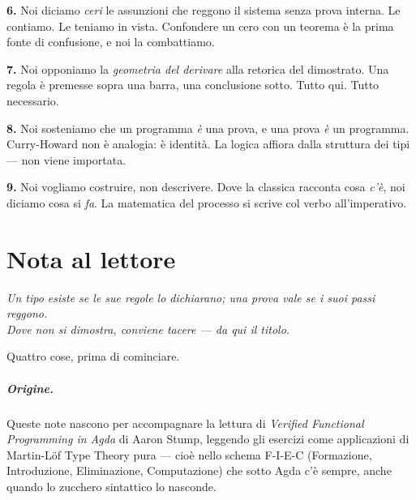 \documentclass[
  oneside,
  openany,
  titlepage,
  11pt,
  a4paper,
  italian,
  DIV=14,
  headinclude,
  footinclude=true,
  cleardoublepage=empty
]{scrbook}
\theoremstyle{ctplain}
\theoremstyle{ctdef}
\theoremstyle{ctrem}
\theoremstyle{ctcero}
\begin{document}
{\color{halfgray}\sffamily\bfseries 6.}\quad
Noi diciamo \emph{ceri} le assunzioni che reggono il sistema senza prova interna. Le contiamo. Le teniamo in vista. Confondere un cero con un teorema \`e la prima fonte di confusione, e noi la combattiamo.

{\color{halfgray}\sffamily\bfseries 7.}\quad
Noi opponiamo la \emph{geometria del derivare} alla retorica del dimostrato. Una regola \`e premesse sopra una barra, una conclusione sotto. Tutto qui. Tutto necessario.

{\color{halfgray}\sffamily\bfseries 8.}\quad
Noi sosteniamo che un programma \emph{\`e} una prova, e una prova \emph{\`e} un programma. Curry-Howard non \`e analogia: \`e identit\`a. La logica affiora dalla struttura dei tipi --- non viene importata.

{\color{halfgray}\sffamily\bfseries 9.}\quad
Noi vogliamo costruire, non descrivere. Dove la classica racconta cosa \emph{c'\`e}, noi diciamo cosa si \emph{fa}. La matematica del processo si scrive col verbo all'imperativo.

\endgroup

\vfill
\begin{center}
{\sffamily\bfseries\color{halfgray}}
\end{center}
\clearpage

\chapter*{Nota al lettore}

\begin{center}
{\itshape\color{halfgray}
Un tipo esiste se le sue regole lo dichiarano; una prova vale se i suoi passi reggono.\\[2pt]
Dove non si dimostra, conviene tacere --- da qui il titolo.}
\end{center}

\bigskip\bigskip

Quattro cose, prima di cominciare.

\paragraph{Origine.} Queste note nascono per accompagnare la lettura di \emph{Verified Functional Programming in Agda} di Aaron Stump, leggendo gli esercizi come applicazioni di Martin-L\"of Type Theory pura --- cio\`e nello schema F-I-E-C (Formazione, Introduzione, Eliminazione, Computazione) che sotto Agda c'\`e sempre, anche quando lo zucchero sintattico lo nasconde.
\end{document}
